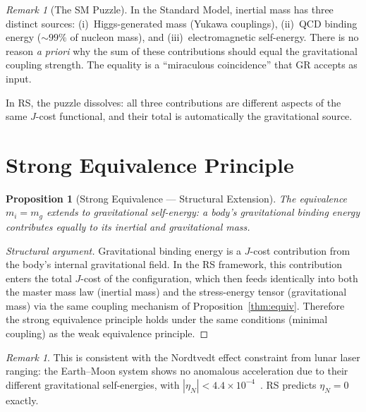 \documentclass[12pt,a4paper]{article}
\newtheorem{proposition}[theorem]{Proposition}
\theoremstyle{definition}
\theoremstyle{remark}
\newtheorem{remark}[theorem]{Remark}
\begin{document}
\begin{remark}[The SM Puzzle]
In the Standard Model, inertial mass has three distinct sources:
(i)~Higgs-generated mass (Yukawa couplings), (ii)~QCD binding
energy ($\sim 99\%$ of nucleon mass), and
(iii)~electromagnetic self-energy.  There is no reason
\emph{a priori} why the sum of these contributions should equal
the gravitational coupling strength.  The equality is a
``miraculous coincidence'' that GR accepts as input.

In RS, the puzzle dissolves: all three contributions are
different aspects of the same $J$-cost functional, and their
total is automatically the gravitational source.
\end{remark}

\section{Strong Equivalence Principle}
\label{sec:strong}

\begin{proposition}[Strong Equivalence --- Structural Extension]
\label{thm:strong}
The equivalence $m_i = m_g$ extends to gravitational
self-energy: a body's gravitational binding energy contributes
equally to its inertial and gravitational mass.
\end{proposition}

\begin{proof}[Structural argument]
Gravitational binding energy is a $J$-cost contribution from
the body's internal gravitational field.  In the RS framework,
this contribution enters the total $J$-cost of the
configuration, which then feeds identically into both the
master mass law (inertial mass) and the stress-energy tensor
(gravitational mass) via the same coupling mechanism of
Proposition~\ref{thm:equiv}.  Therefore the strong
equivalence principle holds under the same conditions
(minimal coupling) as the weak equivalence principle.
\end{proof}

\begin{remark}
This is consistent with the Nordtvedt effect
constraint from lunar laser ranging: the Earth--Moon system
shows no anomalous acceleration due to their different
gravitational self-energies, with
$|\eta_N| < 4.4 \times 10^{-4}$~\cite{Nordtvedt}.
RS predicts $\eta_N = 0$ exactly.
\end{remark}
\end{document}
